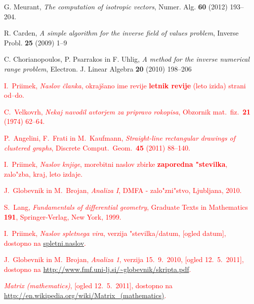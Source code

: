 \documentclass[12pt,a4paper]{amsart}
\theoremstyle{definition}
\theoremstyle{plain}
\begin{document}
\begin{thebibliography}{99}

G. Meurant, \emph{The computation of isotropic vectors}, Numer. Alg. {\bf 60} (2012) 193--204.

R. Carden, \emph{A simple algorithm for the inverse field of values problem}, Inverse Probl. {\bf 25} (2009) 1--9

C. Chorianopoulos, P. Psarrakos in F. Uhlig, \emph{A method for the inverse numerical range problem}, Electron. J. Linear Algebra {\bf 20} (2010) 198--206

\textcolor{Red}{I.~Priimek, \emph{Naslov članka}, okrajšano ime revije {\bf letnik revije} (leto izida) strani od--do.}

\textcolor{Red}{C.~Velkovrh, \emph{Nekaj navodil avtorjem za pripravo rokopisa}, Obzornik mat.\ fiz.\ {\bf 21} (1974) 62--64.}

\textcolor{Red}{P.~Angelini, F.~Frati in M.~Kaufmann, \emph{Straight-line rectangular drawings of clustered graphs}, Discrete Comput.\ Geom.\ {\bf 45} (2011) 88--140.}

\textcolor{Red}{I.~Priimek, \emph{Naslov knjige}, morebitni naslov zbirke  {\bf zaporedna "stevilka}, zalo"zba, kraj, leto izdaje.}

\textcolor{Red}{J.~Globevnik in M.~Brojan, \emph{Analiza I}, DMFA - zalo"zni"stvo, Ljubljana, 2010.}

\textcolor{Red}{S.~Lang, \emph{Fundamentals of differential geometry}, Graduate Texts in Mathematics {\bf 191}, Springer-Verlag, New York, 1999. }

\textcolor{Red}{I.~Priimek, \emph{Naslov spletnega vira}, verzija "stevilka/datum, [ogled datum], dostopno na \url{spletni.naslov}.}

\textcolor{Red}{J.~Globevnik in M.~Brojan, \emph{Analiza 1}, verzija 15.~9.~2010, [ogled 12.~5.~2011], dostopno na \url{http://www.fmf.uni-lj.si/~globevnik/skripta.pdf}.}

\textcolor{Red}{\emph{Matrix (mathematics)}, [ogled 12.~5.~2011], dostopno na \url{http://en.wikipedia.org/wiki/Matrix_(mathematics)}.}

\end{thebibliography}
\end{document}
